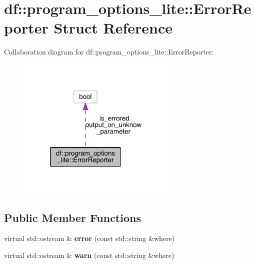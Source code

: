 \hypertarget{structdf_1_1program__options__lite_1_1_error_reporter}{}\section{df\+:\+:program\+\_\+options\+\_\+lite\+:\+:Error\+Reporter Struct Reference}
\label{structdf_1_1program__options__lite_1_1_error_reporter}


Collaboration diagram for df\+:\+:program\+\_\+options\+\_\+lite\+:\+:Error\+Reporter\+:
\nopagebreak
\begin{figure}[H]
\begin{center}
\leavevmode
\includegraphics[width=217pt]{d5/d07/structdf_1_1program__options__lite_1_1_error_reporter__coll__graph}
\end{center}
\end{figure}
\subsection*{Public Member Functions}
\begin{DoxyCompactItemize}
\item 
\mbox{\label{structdf_1_1program__options__lite_1_1_error_reporter_a48a69576c1eaa03af66cade8ee9b2df4}} 
virtual std\+::ostream \& {\bfseries error} (const std\+::string \&where)
\item 
\mbox{\label{structdf_1_1program__options__lite_1_1_error_reporter_a7ab5233983ae6ca3ce93f3d4f2cb153f}} 
virtual std\+::ostream \& {\bfseries warn} (const std\+::string \&where)
\end{DoxyCompactItemize}
